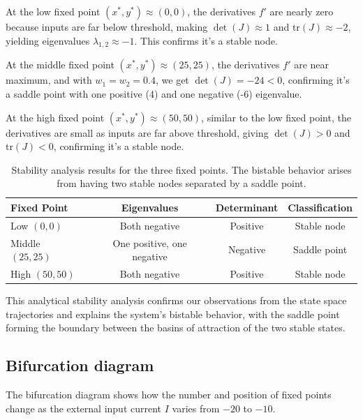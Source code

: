 \documentclass{article}
\begin{document}
At the low fixed point $(x^*,y^*) \approx (0,0)$, the derivatives $f'$ are nearly zero because inputs are far below threshold, making $\det(J) \approx 1$ and $\text{tr}(J) \approx -2$, yielding eigenvalues $\lambda_{1,2} \approx -1$. This confirms it's a stable node.

At the middle fixed point $(x^*,y^*) \approx (25,25)$, the derivatives $f'$ are near maximum, and with $w_1=w_2=0.4$, we get $\det(J) = -24 < 0$, confirming it's a saddle point with one positive (4) and one negative (-6) eigenvalue.

At the high fixed point $(x^*,y^*) \approx (50,50)$, similar to the low fixed point, the derivatives are small as inputs are far above threshold, giving $\det(J) > 0$ and $\text{tr}(J) < 0$, confirming it's a stable node.

\begin{table}[H]
\centering
\begin{tabular}{@{}lccc@{}}
\toprule
\textbf{Fixed Point} & \textbf{Eigenvalues} & \textbf{Determinant} & \textbf{Classification} \\
\midrule
Low $(0,0)$ & Both negative & Positive & Stable node \\
Middle $(25,25)$ & One positive, one negative & Negative & Saddle point \\
High $(50,50)$ & Both negative & Positive & Stable node \\
\bottomrule
\end{tabular}
\caption{Stability analysis results for the three fixed points. The bistable behavior arises from having two stable nodes separated by a saddle point.}
\label{tab:stability}
\end{table}

This analytical stability analysis confirms our observations from the state space trajectories and explains the system's bistable behavior, with the saddle point forming the boundary between the basins of attraction of the two stable states.

\subsection{Bifurcation diagram}

The bifurcation diagram shows how the number and position of fixed points change as the external input current $I$ varies from $-20$ to $-10$.
\end{document}
